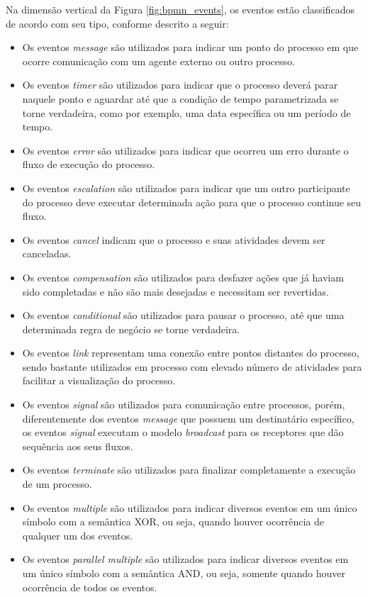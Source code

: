 \begin{enumerate}
    Na dimensão vertical da Figura \ref{fig:bpmn_events}, os eventos estão classificados de acordo com seu tipo, conforme descrito a seguir:
    \begin{itemize}
      \item  Os eventos \textit{message} são utilizados para indicar um ponto do processo em que ocorre comunicação com um agente externo ou outro processo.
      \item Os eventos \textit{timer} são utilizados para indicar que o processo deverá parar naquele ponto e aguardar até que a condição de tempo parametrizada se torne verdadeira, como por exemplo, uma data específica ou um período de tempo.
      \item Os eventos \textit{error} são utilizados para indicar que ocorreu um erro durante o fluxo de execução do processo. 
      \item Os eventos \textit{escalation} são utilizados para indicar que um outro participante do processo deve executar determinada ação para que o processo continue seu fluxo.
      \item Os eventos \textit{cancel} indicam que o processo e suas atividades devem ser canceladas.
       \item Os eventos \textit{compensation} são utilizados para desfazer ações que já haviam sido completadas e não são mais desejadas e necessitam ser revertidas.
       \item Os eventos \textit{conditional} são utilizados para pausar o processo, até que uma determinada regra de negócio se torne verdadeira.
       \item Os eventos \textit{link} representam uma conexão entre pontos distantes do processo, sendo bastante utilizados em processo com elevado número de atividades para facilitar a visualização do processo. 
      \item Os eventos \textit{signal} são utilizados para comunicação entre processos, porém, diferentemente dos eventos \textit{message} que possuem um destinatário específico, os eventos \textit{signal} executam o modelo \textit{broadcast} para os receptores que dão sequência aos seus fluxos. 
      \item Os eventos \textit{terminate} são utilizados para finalizar completamente a execução de um processo. 
      \item Os eventos \textit{multiple} são utilizados para indicar diversos eventos em um único símbolo com a semântica XOR, ou seja, quando houver ocorrência de qualquer um dos eventos.
      \item Os eventos \textit{parallel multiple} são utilizados para indicar diversos eventos em um único símbolo com a semântica AND, ou seja, somente quando houver ocorrência de todos os eventos.
    \end{itemize}
     

\end{enumerate}

